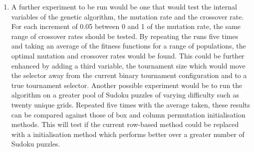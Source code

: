 \documentclass[10pt]{article}
\begin{document}
\begin{enumerate}[label=(\alph*)]
\item  A further experiment to be run would be one that would test the internal variables of the genetic algorithm, the mutation rate and the crossover rate. For each increment of 0.05 between 0 and 1 of the mutation rate, the same range of crossover rates should be tested. By repeating the runs five times and taking an average of the fitness functions for a range of populations, the optimal mutation and crossover rates would be found. This could be further enhanced by adding a third variable, the tournament size which would move the selector away from the current binary tournament configuration and to a true tournament selector. Another possible experiment would be to run the algorithm on a greater pool of Sudoku puzzles of varying difficulty such as twenty unique grids. Repeated five times with the average taken, these results can be compared against those of box and column permutation initialisation methods. This will test if the current row-based method could be replaced with a initialisation method which performs better over a greater number of Sudoku puzzles. 
\end{enumerate}
\end{document}
